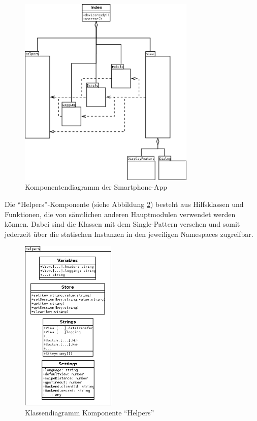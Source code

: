 \begin{figure}[H]
  \begin{center}
    \includegraphics[width=0.75\textwidth]{./img/App_Komponentendiagramm}
    \caption{Komponentendiagramm der Smartphone-App}
    \label{fig:appKomponentendiagramm}
  \end{center}
\end{figure}

Die \enquote{Helpers}-Komponente (siehe Abbildung \ref{fig:appKlassendiagrammHelpers}) besteht aus Hilfsklassen und Funktionen, die von sämtlichen anderen Hauptmodulen verwendet werden können. Dabei sind die Klassen mit dem Single-Pattern versehen und somit jederzeit über die statischen Instanzen in den jeweiligen Namespaces zugreifbar. 

\begin{figure}
  \begin{center}
    \includegraphics[width=0.4\textwidth]{./img/App_Klassendiagramm_Helpers}
    \caption{Klassendiagramm Komponente \enquote{Helpers}}
    \label{fig:appKlassendiagrammHelpers}
  \end{center}
\end{figure}

